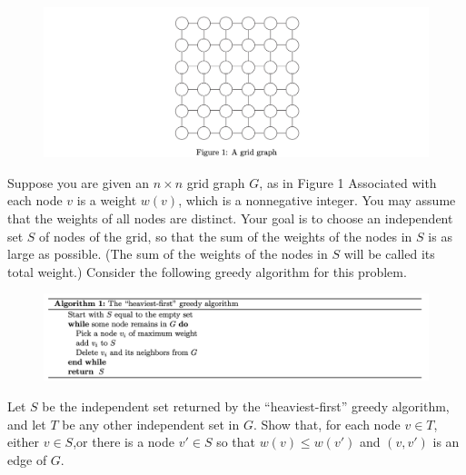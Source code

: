 \newpage
{} %

\problemdes

\begin{figure}[!ht]
    \centering
    \includegraphics[width=\textwidth]{graph.png}
    \label{fig:algo}
\end{figure}

Suppose you are given an $n \times n$ grid graph $G$, as in Figure 1 Associated with each node $v$ is a weight $w(v)$, which is a nonnegative integer. You may assume that the weights of all nodes are distinct. Your goal is to choose an independent set $S$ of nodes of the grid, so that the sum of the weights of the nodes in $S$ is as large as possible. (The sum of the weights of the nodes in $S$ will be called its total weight.) Consider the following greedy algorithm for this problem.

\begin{figure}[!ht]
    \centering
    \includegraphics[width=\textwidth]{algorithm.png}
    \label{fig:algo}
\end{figure}


Let $S$ be the independent set returned by the “heaviest-first” greedy algorithm, and let $T$ be any other independent set in $G$. Show that, for each node $v \in T$, either $v \in S$,or there is a node $v' \in S$ so that $w(v) \le w(v\prime)$ and $(v, v\prime)$ is an edge of $G$.





